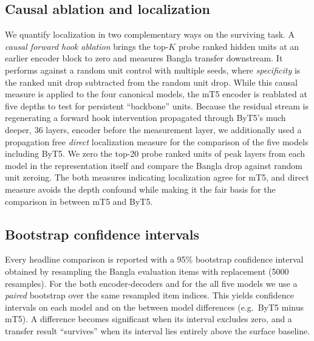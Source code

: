 \documentclass[preprint,12pt,authoryear]{elsarticle}
\begin{document}
\subsection{Causal ablation and localization}
We quantify localization in two complementary ways on the surviving task. A \emph{causal forward hook ablation} brings the top-$K$ probe ranked hidden units at an earlier encoder block to zero and measures Bangla transfer downstream. It performs against a random unit control with multiple seeds, where \emph{specificity} is the ranked unit drop subtracted from the random unit drop. While this causal measure is applied to the four canonical models, the mT5 encoder is reablated at five depths to test for persistent ``backbone'' units. Because the residual stream is regenerating a forward hook intervention propagated through ByT5's much deeper, 36 layers, encoder before the measurement layer, we additionally used a propagation free \emph{direct} localization measure for the comparison of the five models including ByT5. We zero the top-20 probe ranked units of peak layers from each model in the representation itself and compare the Bangla drop against random unit zeroing. The both measures indicating localization agree for mT5, and direct measure avoids the depth confound while making it the fair basis for the comparison in between mT5 and ByT5.

\subsection{Bootstrap confidence intervals}
Every headline comparison is reported with a 95\% bootstrap confidence interval \citep{efron1994bootstrap} obtained by resampling the Bangla evaluation items with replacement (5000 resamples). For the both encoder-decoders and for the all five models we use a \emph{paired} bootstrap over the same resampled item indices. This yields confidence intervals on each model and on the between model differences (e.g.\ ByT5 minus mT5). A difference becomes significant when its interval excludes zero, and a transfer result ``survives'' when its interval lies entirely above the surface baseline.
\end{document}
